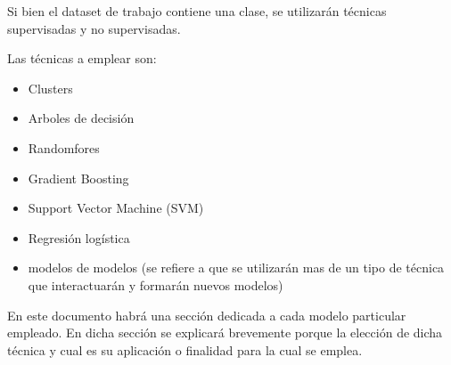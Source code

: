Si bien el dataset de trabajo contiene una clase, se utilizarán técnicas supervisadas y no supervisadas.

Las técnicas a emplear son:
\begin{itemize}
	\item Clusters
	\item Arboles de decisión
	\item Randomfores
	\item Gradient Boosting
	\item Support Vector Machine (SVM)
	\item Regresión logística
	\item modelos de modelos (se refiere a que se utilizarán mas de un tipo de técnica que interactuarán y formarán nuevos modelos)
\end{itemize}


En este documento habrá una sección dedicada a cada modelo particular empleado. En dicha sección se explicará brevemente porque la elección de dicha técnica y cual es su aplicación o finalidad para la cual se emplea.